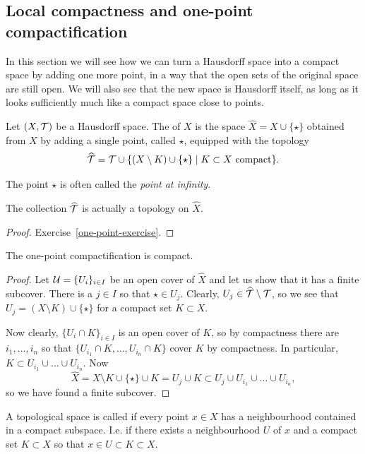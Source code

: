 \subsection{Local compactness and one-point compactification}
In this section we will see how we can turn a Hausdorff space into a compact space by adding one more point, in a way that the open sets of the original space are still open. We will also see that the new space is Hausdorff itself, as long as it looks sufficiently much like a compact space close to points.
\begin{defn}
  Let $(X,\mathcal{T})$ be a Hausdorff space. The  of $X$ is the space $\hat{X} = X \cup \{\star\}$ obtained from $X$ by adding a single point, called $\star$, equipped with the topology
  \[
    \widehat{\mathcal{T}} = \mathcal{T} \cup \{ (X \setminus K) \cup \{\star\} \mid \text{$K \subset X$ compact} \}.
  \]
\end{defn}
The point $\star$ is often called the \emph{point at infinity}.
\begin{prop}
  \label{one-point}
  The collection $\widehat{\mathcal{T}}$ is actually a topology on $\hat{X}$.
\end{prop}
\begin{proof}
  Exercise~\ref{one-point-exercise}.
\end{proof}
\begin{prop}
  The one-point compactification is compact.
\end{prop}
\begin{proof}
  Let $\mathcal{U} = \{U_i\}_{i \in I}$ be an open cover of $\hat{X}$ and let us show that it has a finite subcover. There is a $j \in I$ so that $\star \in U_j$. Clearly, $U_j \in \widehat{\mathcal{T}} \setminus \mathcal{T}$, so we see that $U_j = (X \setminus K) \cup \{\star\}$ for a compact set $K \subset X$.
  
  Now clearly, $\{U_i \cap K\}_{i \in I}$ is an open cover of $K$, so by compactness there are $i_1, \dots, i_n$ so that $\{U_{i_1} \cap K, \dots, U_{i_n} \cap K\}$ cover $K$ by compactness. In particular, $K \subset U_{i_1} \cup \dots \cup U_{i_n}$. Now
  \[
    \hat{X} = X \setminus K \cup \{\star\} \cup K = U_j \cup K \subset U_j \cup U_{i_1} \cup \dots \cup U_{i_n},
  \]
  so we have found a finite subcover.
\end{proof}
\begin{defn}
  A topological space is called  if every point $x \in X$ has a neighbourhood contained in a compact subspace. I.e. if there exists a neighbourhood $U$ of $x$ and a compact set $K \subset X$ so that $x \in U \subset K \subset X$.
\end{defn}
